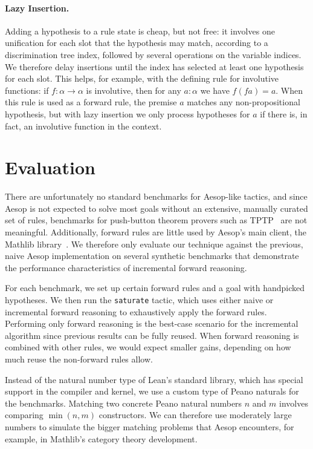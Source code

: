 \documentclass[runningheads,leqno]{llncs}
\newcommand{\para}[1]{\paragraph{\bfseries\upshape #1}}
\begin{document}
\para{Lazy Insertion.}
Adding a hypothesis to a rule state is cheap, but not free: it involves one unification for each slot that the hypothesis may match, according to a discrimination tree index, followed by several operations on the variable indices.
We therefore delay insertions until the index has selected at least one hypothesis for each slot.
This helps, for example, with the defining rule for involutive functions: if $f : α → α$ is involutive, then for any $a : α$ we have $f (f a) = a$.
When this rule is used as a forward rule, the premise $a$ matches any non-propositional hypothesis, but with lazy insertion we only process hypotheses for $a$ if there is, in fact, an involutive function in the context.

\section{Evaluation}%
\label{sec:evaluation}

There are unfortunately no standard benchmarks for Aesop-like tactics, and since Aesop is not expected to solve most goals without an extensive, manually curated set of rules, benchmarks for push-button theorem provers such as TPTP~\cite{TPTP} are not meaningful.
Additionally, forward rules are little used by Aesop's main client, the Mathlib library~\cite{Mathlib}.
We therefore only evaluate our technique against the previous, naive Aesop implementation on several synthetic benchmarks that demonstrate the performance characteristics of incremental forward reasoning.

For each benchmark, we set up certain forward rules and a goal with handpicked hypotheses.
We then run the \texttt{saturate} tactic, which uses either naive or incremental forward reasoning to exhaustively apply the forward rules.
Performing only forward reasoning is the best-case scenario for the incremental algorithm since previous results can be fully reused.
When forward reasoning is combined with other rules, we would expect smaller gains, depending on how much reuse the non-forward rules allow.

Instead of the natural number type of Lean's standard library, which has special support in the compiler and kernel, we use a custom type of Peano naturals for the benchmarks.
Matching two concrete Peano natural numbers $n$ and $m$ involves comparing $\min(n, m)$ constructors.
We can therefore use moderately large numbers to simulate the bigger matching problems that Aesop encounters, for example, in Mathlib's category theory development.
\end{document}

